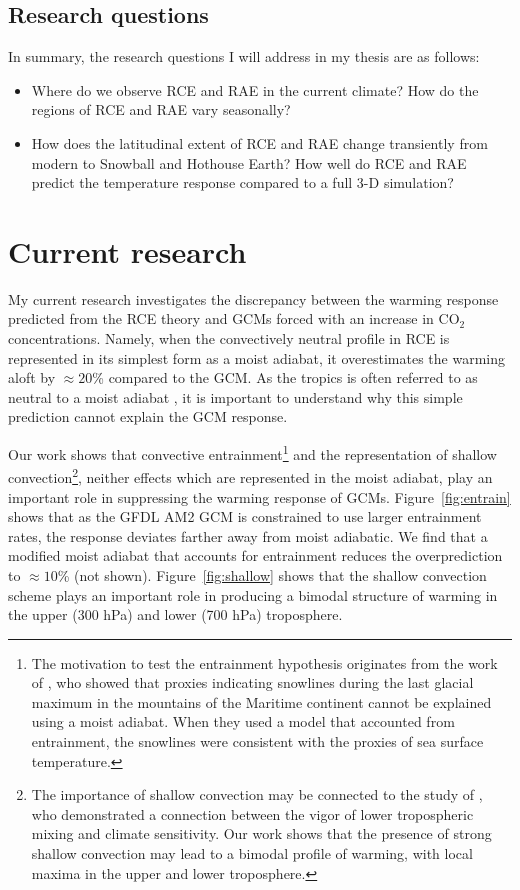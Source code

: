\documentclass{article}
\begin{document}
\subsection{Research questions}

In summary, the research questions I will address in my thesis are as follows:
\begin{itemize}
\item Where do we observe RCE and RAE in the current climate? How do the regions of RCE and RAE vary seasonally?
\item How does the latitudinal extent of RCE and RAE change transiently from modern to Snowball and Hothouse Earth? How well do RCE and RAE predict the temperature response compared to a full 3-D simulation?
\end{itemize}

\section{Current research} \label{sec:current}

My current research investigates the discrepancy between the warming response predicted from the RCE theory and GCMs forced with an increase in CO$_2$ concentrations. Namely, when the convectively neutral profile in RCE is represented in its simplest form as a moist adiabat, it overestimates the warming aloft by $\approx 20$\% compared to the GCM. As the tropics is often referred to as neutral to a moist adiabat \citep{xu-emanuel-1989}, it is important to understand why this simple prediction cannot explain the GCM response.

Our work shows that convective entrainment\footnote{The motivation to test the entrainment hypothesis originates from the work of \citet{tripati-et-al-2014}, who showed that proxies indicating snowlines during the last glacial maximum in the mountains of the Maritime continent cannot be explained using a moist adiabat. When they used a model that accounted from entrainment, the snowlines were consistent with the proxies of sea surface temperature.} and the representation of shallow convection\footnote{The importance of shallow convection may be connected to the study of \citet{sherwood-et-al-2014}, who demonstrated a connection between the vigor of lower tropospheric mixing and climate sensitivity. Our work shows that the presence of strong shallow convection may lead to a bimodal profile of warming, with local maxima in the upper and lower troposphere.}, neither effects which are represented in the moist adiabat, play an important role in suppressing the warming response of GCMs. Figure~\ref{fig:entrain} shows that as the GFDL AM2 GCM \citep{anderson-et-al-2004} is constrained to use larger entrainment rates, the response deviates farther away from moist adiabatic. We find that a modified moist adiabat that accounts for entrainment \citep{singh-ogorman-2013, romps-2014} reduces the overprediction to $\approx 10$\% (not shown). Figure~\ref{fig:shallow} shows that the shallow convection scheme plays an important role in producing a bimodal structure of warming in the upper (300 hPa) and lower (700 hPa) troposphere.
\end{document}

